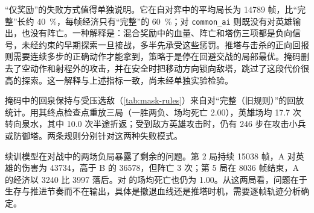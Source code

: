 “仅奖励”的失败方式值得单独说明。它在自对弈中的平均局长为 \num{14789} 帧，比“完整”长约 \qty{40}{\percent}，每帧经济只有“完整”的 \qty{60}{\percent}；对 \texttt{common\_ai} 则既没有对英雄输出，也没有阵亡。一种解释是：混合奖励中的血量、阵亡和塔伤三项都是负向信号，未经约束的早期探索一旦接战，多半先承受这些惩罚。推塔与击杀的正向回报则需要连续多步的正确动作才能拿到，策略于是停在回避交战的局部最优。掩码删去了空动作和射程外的攻击，并在安全时把移动方向锁向敌塔，跳过了这段代价很高的探索。这一解释与上述指标一致，尚未经单独实验检验。

掩码中的回泉保持与受压选敌（\cref{tab:mask-rules}）来自对“完整（旧规则）”的回放统计。用其终点检查点重放三局（一胜两负、场均死亡 \num{2.00}），英雄场均 \num{17.7} 次转向泉水，其中 \num{10.0} 次半途折返；受到敌方英雄攻击时，仍有 \num{246} 步在攻击小兵或防御塔。两条规则分别针对这两种失败模式。

续训模型在对战中的两场负局暴露了剩余的问题。第 \num{2} 局持续 \num{15038} 帧，A 对英雄的伤害为 \num{43734}，高于 B 的 \num{36578}，但阵亡 \num{3} 次；第 \num{5} 局在 \num{8036} 帧结束，A 的经济以 \num{3240} 比 \num{3997} 落后。对  的场均死亡也仍为 \num{1.00}。从这两局看，问题在于生存与推进节奏而不在输出，具体是撤退血线还是推塔时机，需要逐帧轨迹分析确定。
